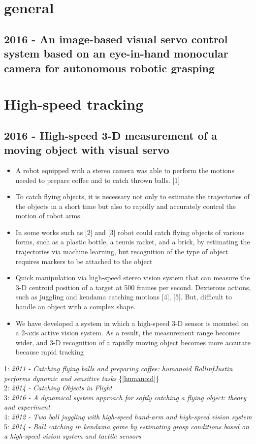 \section{general}
\subsection{2016 - An image-based visual servo control system based on an eye-in-hand monocular camera for autonomous robotic grasping}

\section{High-speed tracking}
\subsection{2016 - High-speed 3-D measurement of a moving object with visual servo}
\begin{itemize}
\item A robot equipped with a stereo camera was able to perform the motions needed to prepare coffee and to catch thrown balls. [1]
\item To catch flying objects, it is necessary not only to estimate the trajectories of the objects in a short time but also to rapidly and accurately control the motion of robot arms.
\item In some works such as [2] and [3] robot could catch flying objects of various forms, such as a plastic bottle, a tennis racket, and a brick, by estimating the trajectories via machine learning, but recognition of the type of object requires markers to be attached to the object
\item Quick manipulation via high-speed stereo vision system that can measure the 3-D centroid position of a target at 500 frames per second. Dexterous actions, such as juggling and kendama catching motions [4], [5]. But, difficult to handle an object with a complex shape.
\item  We have developed a system in which a high-speed 3-D sensor is mounted on a 2-axis active vision system. As a result, the measurement range becomes wider, and 3-D recognition of a
rapidly moving object becomes more accurate because rapid
tracking
\end{itemize}
1: \textit{2011 -  Catching flying balls and preparing coffee: humanoid RollinfJustin performs dynamic and sensitive tasks} \{\ref{humanoid}\} \\
2: \textit{2014 -  Catching Objects in Flight} \\
3: \textit{2016 - A dynamical system
approach for softly catching a flying object: theory and experiment} \\
4: \textit{2012 - Two ball
juggling with high-speed hand-arm and high-speed vision system} \\
5: \textit{2014 - Ball catching in kendama game by estimating
grasp conditions based on a high-speed vision system and tactile
sensors}

